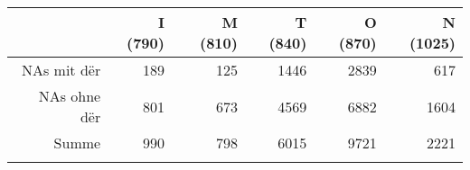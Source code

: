 \begin{tabular}{rrrrrr}
  \lsptoprule
 & I (790) & M (810) & T (840) & O (870) & N (1025) \\ 
  \midrule
NAs mit dër & 189 & 125 & 1446 & 2839 & 617 \\ 
  NAs ohne dër & 801 & 673 & 4569 & 6882 & 1604 \\ 
  Summe & 990 & 798 & 6015 & 9721 & 2221 \\ 
   \lspbottomrule
\end{tabular}
